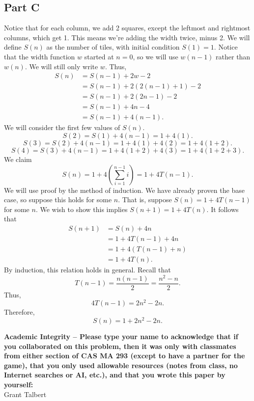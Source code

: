 \documentclass[11pt, letterpaper]{article}
\begin{document}
\subsection*{Part C}
\begin{solution}
Notice that for each column, we add 2 squares, except the leftmost and rightmost columns, which get 1. This means we're adding the width twice, minus 2. We will define $S(n)$ as the number of tiles, with initial condition $S(1)=1$. Notice that the width function $w$ started at $n=0$, so we will use $w(n-1 )$ rather than $w(n)$. We will still only write $w$. Thus,
\begin{align*}
	S(n)&=S(n-1)+2w-2\\
	    &=S(n-1)+2(2(n-1)+1)-2\\
	    &=S(n-1)+2(2n-1)-2\\
	    &=S(n-1)+4n-4\\
	    &=S(n-1)+4(n-1)
.\end{align*}
We will consider the first few values of $S(n)$.
\[
	S(2)=S(1)+4(n-1)=1+4(1)
.\]
\[
	S(3)=S(2)+4(n-1)=1+4(1)+4(2)=1+4(1+2)
.\]
\[
	S(4)=S(3)+4(n-1)=1+4(1+2)+4(3)=1+4(1+2+3)
.\]
We claim
 \[
	S(n)=1+4\left( \sum_{i=1}^{n-1} i \right) =1+4T(n-1)
.\]
We will use proof by the method of induction. We have already proven the base case, so suppose this holds for some $n$. That is, suppose $S(n)=1+4T(n-1)$ for some $n$. We wish to show this implies $S(n+1)=1+4T(n)$. It follows that
\begin{align*}
	S(n+1)&=S(n)+4n\\
	      &=1+4T(n-1)+4n\\
	      &=1+4(T(n-1)+n)\\
	      &=1+4T(n)
.\end{align*}
By induction, this relation holds in general. Recall that
\[
	T(n-1)=\frac{n(n-1)}{2}=\frac{n^2-n}{2}
.\]
Thus,
\[
	4T(n-1)=2n^2-2n
.\]
Therefore,
\[
	S(n)=1+2n^2-2n
.\]
\end{solution}

\textbf{Academic Integrity -- Please type your name to acknowledge that if you collaborated on this problem, then it was only with classmates from either section of CAS MA 293 (except to have a partner for the game), that you only used allowable resources (notes from class, no Internet searches or AI, etc.), and that you wrote this paper by yourself:}\\
Grant Talbert
\end{document}
